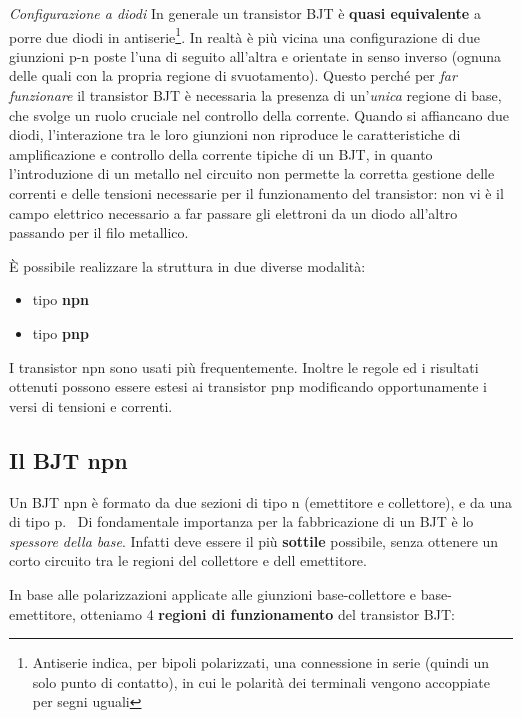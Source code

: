 \documentclass[
]{book}
\providecommand{\tightlist}{%
  \setlength{\itemsep}{0pt}\setlength{\parskip}{0pt}}
\begin{document}
\begin{redbox}{\emph{Configurazione a diodi}}
In generale un transistor BJT è \textbf{quasi equivalente }a porre due diodi in antiserie\footnote{Antiserie indica, per bipoli polarizzati, una connessione in serie (quindi un solo punto di contatto), in cui le polarità dei terminali vengono accoppiate per segni uguali}. In realtà è più vicina una configurazione di due giunzioni p-n poste l'una di seguito all'altra e orientate in senso inverso (ognuna delle quali con la propria regione di svuotamento). Questo perché per \emph{far funzionare} il transistor BJT è necessaria la presenza di un'\emph{unica} regione di base, che svolge un ruolo cruciale nel controllo della corrente. Quando si affiancano due diodi, l'interazione tra le loro giunzioni non riproduce le caratteristiche di amplificazione e controllo della corrente tipiche di un BJT, in quanto l'introduzione di un metallo nel circuito non permette la corretta gestione delle correnti e delle tensioni necessarie per il funzionamento del transistor: non vi è il campo elettrico necessario a far passare gli elettroni da un diodo all'altro passando per il filo metallico.
\end{redbox}

È possibile realizzare la struttura in due diverse modalità:

\begin{itemize}
\tightlist
\item
  tipo \textbf{npn}
\item
  tipo \textbf{pnp}
\end{itemize}

I transistor npn sono usati più frequentemente. Inoltre le regole ed i
risultati ottenuti possono essere estesi ai transistor pnp modificando
opportunamente i versi di tensioni e correnti.

\subsection{Il BJT npn}\label{il-bjt-npn}

Un BJT npn è formato da due sezioni di tipo n (emettitore e collettore),
e da una di tipo p.~ Di fondamentale importanza per la fabbricazione di
un BJT è lo \emph{spessore della base}. Infatti deve essere il più
\textbf{sottile} possibile, senza ottenere un corto circuito tra le
regioni del collettore e dell emettitore.

In base alle polarizzazioni applicate alle giunzioni base-collettore e
base-emettitore, otteniamo 4 \textbf{regioni di funzionamento} del
transistor BJT:
\end{document}
